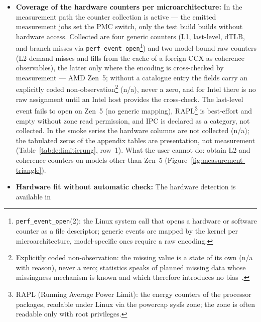 \begin{nurlang}
\begin{itemize}
  fingerprint of the measured binary and the hardware identity, the platform cell bracketed beside
  it (Section~\ref{sec:lager}) ---; the entire store has to be measured separately per machine type
  and hardware configuration. What the user cannot do: transfer measured values from one machine
  to another. That is the price of machine-specific optimization (ATLAS~\cite{whaley2001atlas},
  FFTW~\cite{frigo1998fftw}) and the reason for the three machine signatures of the system
  registry.
  \item \textbf{Coverage of the hardware counters per microarchitecture:} In the measurement path
  the counter collection is active --- the emitted measurement jobs set the PMC switch, only the
  test build builds without hardware access. Collected are four generic counters (L1, last-level,
  dTLB, and branch misses via \texttt{perf\_event\_open}\footnote{\texttt{perf\_event\_open}(2): the
  Linux system call that opens a hardware or software counter as a file descriptor; generic events
  are mapped by the kernel per microarchitecture, model-specific ones require a raw encoding.})
  and two model-bound raw counters (L2 demand misses and fills from the cache of a foreign CCX as
  coherence observables), the latter only where the encoding is cross-checked by measurement ---
  AMD Zen~5; without a catalogue entry the fields carry an explicitly coded
  non-observation\footnote{Explicitly coded non-observation: the missing value is a state of its own
  (n/a with reason), never a zero; statistics speaks of planned missing data whose missingness
  mechanism is known and which therefore introduces no bias~\cite{graham2006planned,graham2009missing}.}
  (n/a), never a zero, and for Intel there is no raw assignment until an Intel host provides the
  cross-check. The last-level event fails to open on Zen~5 (no generic mapping),
  RAPL\footnote{RAPL (Running Average Power Limit): the energy counters of the processor packages,
  readable under Linux via the powercap sysfs zone; the zone is often readable only with root
  privileges.} is best-effort and empty without zone read permission, and IPC is declared as a
  category, not collected. In the smoke series the hardware columns are not collected (n/a); the
  tabulated zeros of the appendix tables are presentation, not measurement
  (Table~\ref{tab:le:limitierung}, row~1). What the user cannot do: obtain L2 and coherence
  counters on models other than Zen~5 (Figure~\ref{fig:measurement-triangle}).
  \item \textbf{Hardware fit without automatic check:} The hardware detection is available in

\end{itemize}
\end{nurlang}
